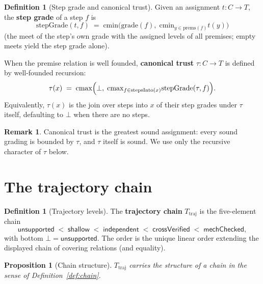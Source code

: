 \documentclass[11pt,a4paper]{article}
\theoremstyle{plain}
\newtheorem{proposition}[theorem]{Proposition}
\theoremstyle{definition}
\newtheorem{definition}[theorem]{Definition}
\newtheorem{remark}[theorem]{Remark}
\newcommand{\cmin}{\mathrm{cmin}}
\newcommand{\cmax}{\mathrm{cmax}}
\newcommand{\tauu}{\tau}
\begin{document}
\begin{definition}[Step grade and canonical trust]\label{def:tau}
Given an assignment $t : C \to T$, the \textbf{step grade} of a step $f$ is
\begin{equation}
  \mathrm{stepGrade}(t,f)
  \;=\;
  \cmin\bigl(
    \mathrm{grade}(f),\;
    \cmin_{y \in \mathrm{prems}(f)} t(y)
  \bigr)
\end{equation}
(the meet of the step's own grade with the assigned levels of all premises;
empty meets yield the step grade alone).

When the premise relation is well founded, \textbf{canonical trust}
$\tauu : C \to T$ is defined by well-founded recursion:
\begin{equation}
  \tauu(x)
  \;=\;
  \cmax\Bigl(
    \bot,\;
    \cmax_{f \in \mathrm{stepsInto}(x)}
      \mathrm{stepGrade}(\tauu, f)
  \Bigr).
\end{equation}
Equivalently, $\tauu(x)$ is the join over steps into $x$ of their step
grades under $\tauu$ itself, defaulting to $\bot$ when there are no steps.
\end{definition}

\begin{remark}
Canonical trust is the greatest sound assignment: every sound grading is
bounded by $\tauu$, and $\tauu$ itself is sound. We use only the recursive
character of $\tauu$ below.
\end{remark}

\section{The trajectory chain}

\begin{definition}[Trajectory levels]\label{def:tlevel}
The \textbf{trajectory chain} $T_{\mathrm{traj}}$ is the five-element chain
\begin{equation}
  \mathsf{unsupported}
  \;<\;
  \mathsf{shallow}
  \;<\;
  \mathsf{independent}
  \;<\;
  \mathsf{crossVerified}
  \;<\;
  \mathsf{mechChecked},
\end{equation}
with bottom $\bot = \mathsf{unsupported}$. The order is the unique linear
order extending the displayed chain of covering relations (and equality).
\end{definition}

\begin{proposition}[Chain structure]\label{prop:tlevel-chain}
$T_{\mathrm{traj}}$ carries the structure of a chain in the sense of
Definition~\ref{def:chain}.
\end{proposition}
\end{document}
